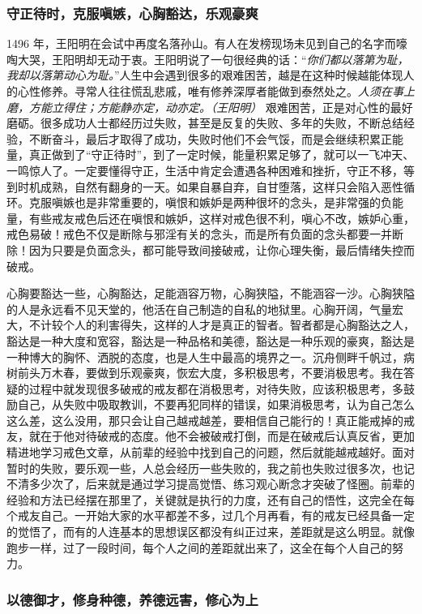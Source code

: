 \subsubsection{守正待时，克服嗔嫉，心胸豁达，乐观豪爽}

1496 年，王阳明在会试中再度名落孙山。有人在发榜现场未见到自己的名字而嚎啕大哭，王阳明却无动于衷。王阳明说了一句很经典的话：“\textit{你们都以落第为耻，我却以落第动心为耻。}”人生中会遇到很多的艰难困苦，越是在这种时候越能体现人的心性修养。寻常人往往慌乱悲戚，唯有修养深厚者能做到泰然处之。\textit{人须在事上磨，方能立得住；方能静亦定，动亦定。（王阳明）} 艰难困苦，正是对心性的最好磨砺。很多成功人士都经历过失败，甚至是反复的失败、多年的失败，不断总结经验，不断奋斗，最后才取得了成功，失败时他们不会气馁，而是会继续积累正能量，真正做到了“守正待时”，到了一定时候，能量积累足够了，就可以一飞冲天、一鸣惊人了。一定要懂得守正，生活中肯定会遭遇各种困难和挫折，守正不移，等到时机成熟，自然有翻身的一天。如果自暴自弃，自甘堕落，这样只会陷入恶性循环。克服嗔嫉也是非常重要的，嗔恨和嫉妒是两种很坏的念头，是非常强的负能量，有些戒友戒色后还在嗔恨和嫉妒，这样对戒色很不利，嗔心不改，嫉妒心重，戒色易破！戒色不仅是断除与邪淫有关的念头，而是所有负面的念头都要一并断除！因为只要是负面念头，都可能导致间接破戒，让你心理失衡，最后情绪失控而破戒。

心胸要豁达一些，心胸豁达，足能涵容万物，心胸狭隘，不能涵容一沙。心胸狭隘的人是永远看不见天堂的，他活在自己制造的自私的地狱里。心胸开阔，气量宏大，不计较个人的利害得失，这样的人才是真正的智者。智者都是心胸豁达之人，豁达是一种大度和宽容，豁达是一种品格和美德，豁达是一种乐观的豪爽，豁达是一种博大的胸怀、洒脱的态度，也是人生中最高的境界之一。沉舟侧畔千帆过，病树前头万木春，要做到乐观豪爽，恢宏大度，多积极思考，不要消极思考。我在答疑的过程中就发现很多破戒的戒友都在消极思考，对待失败，应该积极思考，多鼓励自己，从失败中吸取教训，不要再犯同样的错误，如果消极思考，认为自己怎么这么差，这么没用，那只会让自己越戒越差，要相信自己能行的！真正能戒掉的戒友，就在于他对待破戒的态度。他不会被破戒打倒，而是在破戒后认真反省，更加精进地学习戒色文章，从前辈的经验中找到自己的问题，然后就能越戒越好。面对暂时的失败，要乐观一些，人总会经历一些失败的，我之前也失败过很多次，也记不清多少次了，后来就是通过学习提高觉悟、练习观心断念才突破了怪圈。前辈的经验和方法已经摆在那里了，关键就是执行的力度，还有自己的悟性，这完全在每个戒友自己。一开始大家的水平都差不多，过几个月再看，有的戒友已经具备一定的觉悟了，而有的人连基本的思想误区都没有纠正过来，差距就是这么明显。就像跑步一样，过了一段时间，每个人之间的差距就出来了，这全在每个人自己的努力。

\subsubsection{以德御才，修身种德，养德远害，修心为上}

